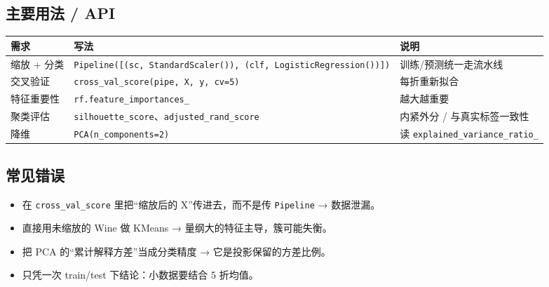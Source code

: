 \subsection{主要用法 / API}\label{ux4e3bux8981ux7528ux6cd5-api-34}

{\def\LTcaptype{none} %
\begin{longtable}[]{@{}
  >{\raggedright\arraybackslash}p{}
  >{\raggedright\arraybackslash}p{}
  >{\raggedright\arraybackslash}p{}@{}}
\toprule\noalign{}
\begin{minipage}[b]{\linewidth}\raggedright
需求
\end{minipage} & \begin{minipage}[b]{\linewidth}\raggedright
写法
\end{minipage} & \begin{minipage}[b]{\linewidth}\raggedright
说明
\end{minipage} \\
\midrule\noalign{}
\endhead
\bottomrule\noalign{}
\endlastfoot
缩放 + 分类 &
\texttt{Pipeline({[}(\textquotesingle{}sc\textquotesingle{},\ StandardScaler()),\ (\textquotesingle{}clf\textquotesingle{},\ LogisticRegression()){]})}
& 训练/预测统一走流水线 \\
交叉验证 & \texttt{cross\_val\_score(pipe,\ X,\ y,\ cv=5)} &
每折重新拟合 \\
特征重要性 & \texttt{rf.feature\_importances\_} & 越大越重要 \\
聚类评估 & \texttt{silhouette\_score}、\texttt{adjusted\_rand\_score} &
内紧外分 / 与真实标签一致性 \\
降维 & \texttt{PCA(n\_components=2)} & 读
\texttt{explained\_variance\_ratio\_} \\
\end{longtable}
}

\subsection{常见错误}\label{ux5e38ux89c1ux9519ux8bef-34}

\begin{itemize}
\tightlist
\item
  在 \texttt{cross\_val\_score} 里把``缩放后的 X''传进去，而不是传
  \texttt{Pipeline} → 数据泄漏。
\item
  直接用未缩放的 Wine 做 KMeans → 量纲大的特征主导，簇可能失衡。
\item
  把 PCA 的``累计解释方差''当成分类精度 → 它是投影保留的方差比例。
\item
  只凭一次 train/test 下结论：小数据要结合 5 折均值。
\end{itemize}

